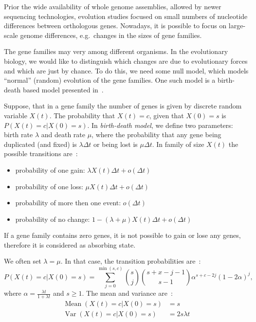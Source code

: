 Prior the wide availability of whole genome assemblies, allowed by newer sequencing technologies, evolution studies focused on small numbers of nucleotide differences between orthologous genes. Nowadays, it is possible to focus on large-scale genome differences, e.g.\ changes in the sizes of gene families.

The gene families may very among different organisms. In the evolutionary biology, we would like to distinguish which changes are due to evolutionary forces and which are just by chance. To do this, we need some null model, which models ``normal'' (random) evolution of the gene families. One such model is a birth-death based model presented in~\cite{hahn2005estimating}.

Suppose, that in a gene family the number of genes is given by discrete random variable $X(t)$. The probability that $X(t) = c$, given that $X(0) = s$ is $P(X(t) = c | X(0) = s)$.
In \emph{birth-death model}, we define two parameters: birth rate $\lambda$ and death rate $\mu$, where the probability that any gene being duplicated (and fixed) is $\lambda \Delta t$ or being lost is $\mu \Delta t$. In family of size $X(t)$ the possible transitions are~\cite{hahn2005estimating}:
\begin{itemize}
  \item probability of one gain: $\lambda X(t) \Delta t + o(\Delta t)$
  \item probability of one loss: $\mu X(t) \Delta t + o(\Delta t)$
  \item probability of more then one event: $o(\Delta t)$
  \item probability of no change: $1 - (\lambda + \mu) X(t) \Delta t + o(\Delta t)$
\end{itemize}
If a gene family contains zero genes, it is not possible to gain or lose any genes, therefore it is considered as absorbing state.

We often set $\lambda = \mu$. In that case, the transition probabilities are~\cite{hahn2005estimating}:
$$P(X(t) = c | X(0) = s) = \sum_{j=0}^{\min(s, c)} {s \choose j}{s+x-j-1 \choose s-1}\alpha^{s+c-2j}{(1-2\alpha)}^j,$$
where $\alpha = \frac{\lambda t}{1+ \lambda t}$ and $s \geq 1$. The mean and variance are~\cite{hahn2005estimating}:
\begin{align*}
  \operatorname{Mean}(X(t) = c | X(0) = s) &= s\\
  \operatorname{Var}(X(t) = c | X(0) = s) &= 2s\lambda t
\end{align*}

